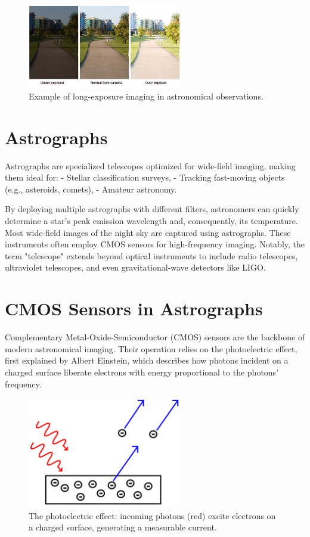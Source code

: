 \documentclass[12pt,oneside,a4paper,english]{article}
\begin{document}
\begin{figure}[H]
    \centering
    \includegraphics[width=0.6\textwidth]{Exposure1.jpg}
    \caption{Example of long-exposure imaging in astronomical observations.}
    \label{Exposure2}
\end{figure}

\section{Astrographs}
Astrographs are specialized telescopes optimized for wide-field imaging, making them ideal for:
- Stellar classification surveys,
- Tracking fast-moving objects (e.g., asteroids, comets),
- Amateur astronomy.

By deploying multiple astrographs with different filters, astronomers can quickly determine a star's peak emission wavelength and, consequently, its temperature. Most wide-field images of the night sky are captured using astrographs. These instruments often employ CMOS sensors for high-frequency imaging. Notably, the term "telescope" extends beyond optical instruments to include radio telescopes, ultraviolet telescopes, and even gravitational-wave detectors like LIGO.

\section{CMOS Sensors in Astrographs}
Complementary Metal-Oxide-Semiconductor (CMOS) sensors are the backbone of modern astronomical imaging. Their operation relies on the photoelectric effect, first explained by Albert Einstein, which describes how photons incident on a charged surface liberate electrons with energy proportional to the photons' frequency.

\begin{figure}[H]
    \centering
    \includegraphics[width=0.6\textwidth]{Photoelectric_effect.svg.png}
    \caption{The photoelectric effect: incoming photons (red) excite electrons on a charged surface, generating a measurable current.\cite{pe1}}
    \label{pe2}
\end{figure}
\end{document}
